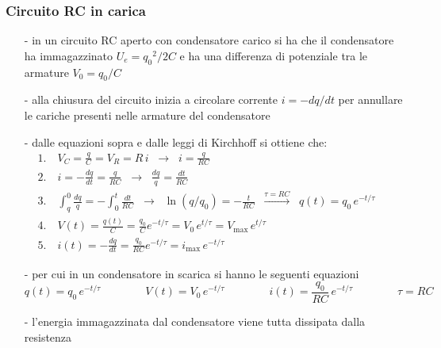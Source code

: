 \documentclass[a4paper]{article}
\begin{document}
\newpage

\subsubsection*{Circuito RC in carica}
\begin{itemize}[topsep=3pt, itemsep=0pt]
	\item[-] in un circuito RC aperto con condensatore carico si ha che il condensatore ha immagazzinato \(U_e = {q_0}^2 / 2C\) e
	ha una differenza di potenziale tra le armature \(V_0 = q_0/C\)
	\item[-] alla chiusura del circuito inizia a circolare corrente \(i = - dq/dt\) per annullare le cariche presenti nelle armature
	del condensatore
	\item[-] dalle equazioni sopra e dalle leggi di Kirchhoff si ottiene che:
	\begin{align*}
		&1. \quad V_C = \frac{q}{C} = V_R = R \, i \;\;\rightarrow\;\; i = \frac{q}{RC} \\
		&2. \quad i = - \frac{dq}{dt} = \frac{q}{RC} \;\;\rightarrow\;\; \frac{dq}{q} = \frac{dt}{RC} \\
		&3. \quad \int_q^0 \frac{dq}{q} = - \int_0^t \frac{dt}{RC} \;\;\rightarrow\;\; \ln(q/q_0) = -\frac{t}{RC} \;\;\stackrel{\tau = RC}{\rightarrow}\;\; q(t) = q_0 \, e^{-t/\tau} \\
		&4. \quad V(t) = \frac{q(t)}{C} = \frac{q_0}{C} e^{-t/\tau} = V_0 \, e^{t/\tau} = V_\text{max} \, e^{t/\tau} \\
		&5. \quad i(t) = -\frac{dq}{dt} = \frac{q_0}{RC}e^{-t/\tau} = i_\text{max} \, e^{-t/\tau} \qquad\qquad\qquad\qquad\qquad\qquad\qquad\qquad\qquad
	\end{align*}
	\item[-] per cui in un condensatore in scarica si hanno le seguenti equazioni
	\[q(t) = q_0 \, e^{-t/\tau} \qquad \qquad V(t) = V_0 \, e^{-t/\tau} \qquad \qquad i(t) = \frac{q_0}{RC} \, e^{-t/\tau} \qquad \qquad \tau = RC\]
	\item[-] l'energia immagazzinata dal condensatore viene tutta dissipata dalla resistenza
\end{itemize}
\end{document}
